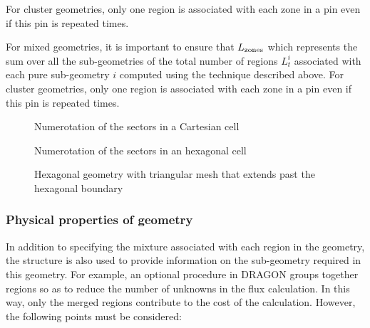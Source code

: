 For cluster geometries, only one region is associated with each zone in a pin even if this pin is repeated  times.

\vskip 0.08cm

For mixed geometries, it is important to ensure that $L_{\rm{zones}}$ which represents the
sum over all the sub-geometries of the total number of regions $L^i_t$
associated with each pure sub-geometry $i$ computed using the technique
described above. For cluster geometries, only one region is associated with each
zone in a pin even if this pin is repeated  times.

\begin{figure}[h!]
\begin{center} 
\epsfxsize=16cm
\centerline{ }
\parbox{14cm}{\caption{Numerotation of the sectors in a Cartesian cell}\label{fig:rect3}}   
\end{center}
\end{figure}

\begin{figure}[h!]
\begin{center} 
\epsfxsize=13cm
\centerline{ }
\parbox{14cm}{\caption{Numerotation of the sectors in an hexagonal cell}\label{fig:hexa3}}   
\end{center}
\end{figure}

\begin{figure}[h!]  
\begin{center} 
\parbox{11.0cm}{\epsfxsize=11cm }
\parbox{14cm}{\caption{Hexagonal geometry with triangular mesh that extends past the hexagonal boundary}\label{fig:GeoHEXT4C}}   
\end{center}  
\end{figure}

\subsubsection{Physical properties of geometry}\label{sect:descPP}

In addition to specifying the mixture associated with each region in the
geometry, the  structure is also used to provide information on the
sub-geometry required in this geometry. For example, an optional procedure in
DRAGON groups together regions so as to reduce the number of unknowns
 in the flux calculation. In this way, only the merged regions
contribute to the cost of the calculation. However, the following points must be
considered:

